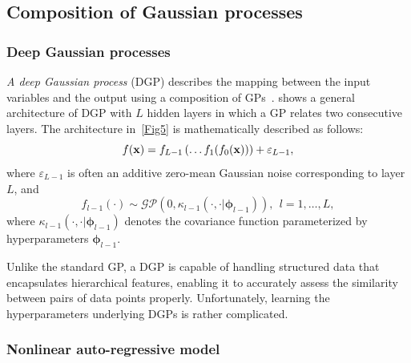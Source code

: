 \documentclass[iicol,sn-basic]{sn-jnl}%
\begin{document}
\subsection{Composition of Gaussian processes}\label{Sec45}

\subsubsection{Deep Gaussian processes}\label{Sec451}
\textit{A deep Gaussian process} (DGP) describes the mapping between the input variables and the output using a composition of GPs~\citep{Damianou2013}.
 shows a general architecture of DGP with $L$ hidden layers in which a GP relates two consecutive layers.
The architecture in~\cref{Fig5} is mathematically described as follows:
\begin{equation}\label{Eq21}
	f({\bf x}) = f_{L-1}\left(\dots f_1(f_0({\bf x}))\right)+\varepsilon_{L-1},
\end{equation}
where $\varepsilon_{L-1}$ is often an additive zero-mean Gaussian noise corresponding to layer $L$, and
\begin{equation}\label{Eq22}
	f_{l-1}(\cdot) \sim \mathcal{GP}\left(0,\kappa_{l-1}(\cdot,\cdot|{\boldsymbol \phi}_{l-1})\right), \ \ l=1,\dots,L,
\end{equation}
where $\kappa_{l-1}(\cdot,\cdot|{\boldsymbol \phi}_{l-1})$ denotes the covariance function parameterized by hyperparameters ${\boldsymbol \phi}_{l-1}$.

Unlike the standard GP, a DGP is capable of handling structured data that encapsulates hierarchical features, enabling it to accurately assess the similarity between pairs of data points properly.
Unfortunately, learning the hyperparameters underlying DGPs is rather complicated. 

\subsubsection{Nonlinear auto-regressive model}\label{Sec452}
\end{document}
